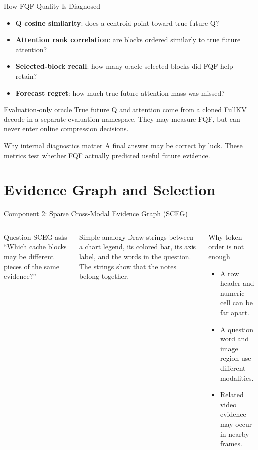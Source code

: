\documentclass[aspectratio=169,10pt]{beamer}
\newcommand{\tightitems}{\setlength{\itemsep}{0.28em}\setlength{\parskip}{0pt}}
\begin{document}
\begin{frame}{How FQF Quality Is Diagnosed}
\small
\begin{itemize}\tightitems
  \item \textbf{Q cosine similarity}: does a centroid point toward true future Q?
  \item \textbf{Attention rank correlation}: are blocks ordered similarly to true future attention?
  \item \textbf{Selected-block recall}: how many oracle-selected blocks did FQF help retain?
  \item \textbf{Forecast regret}: how much true future attention mass was missed?
\end{itemize}
\begin{alertblock}{Evaluation-only oracle}
True future Q and attention come from a cloned FullKV decode in a separate evaluation namespace.
They may measure FQF, but can never enter online compression decisions.
\end{alertblock}
\begin{exampleblock}{Why internal diagnostics matter}
A final answer may be correct by luck. These metrics test whether FQF actually predicted useful
future evidence.
\end{exampleblock}
\end{frame}

\section{Evidence Graph and Selection}

\begin{frame}{Component 2: Sparse Cross-Modal Evidence Graph (SCEG)}
\small
\begin{columns}[T,onlytextwidth]
\begin{block}{Question SCEG asks}
``Which cache blocks may be different pieces of the same evidence?''
\end{block}
\begin{exampleblock}{Simple analogy}
Draw strings between a chart legend, its colored bar, its axis label, and the words in the question.
The strings show that the notes belong together.
\end{exampleblock}
\begin{alertblock}{Why token order is not enough}
\begin{itemize}\tightitems
  \item A row header and numeric cell can be far apart.
  \item A question word and image region use different modalities.
  \item Related video evidence may occur in nearby frames.
\end{itemize}
\end{alertblock}
\end{columns}
\end{frame}
\end{document}
